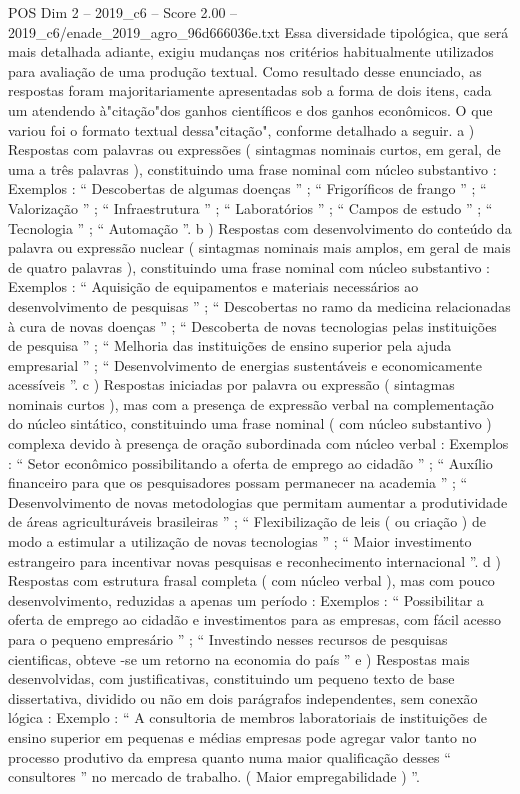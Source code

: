 \begin{textsample}{POS Dim 2 – 2019\_c6 – Score 2.00 – 2019\_c6/enade\_2019\_agro\_96d666036e.txt}
Essa diversidade tipológica, que será mais detalhada adiante, exigiu mudanças nos critérios habitualmente utilizados para avaliação de uma produção textual.
Como resultado desse enunciado, as respostas foram majoritariamente apresentadas sob a forma de dois itens, cada um atendendo à"citação"dos ganhos científicos e dos ganhos econômicos.
O que variou foi o formato textual dessa"citação", conforme detalhado a seguir. a ) Respostas com palavras ou expressões ( sintagmas nominais curtos, em geral, de uma a três palavras ), constituindo uma frase nominal com núcleo substantivo : Exemplos : “ Descobertas de algumas doenças ” ; “ Frigoríficos de frango ” ; “ Valorização ” ; “ Infraestrutura ” ; “ Laboratórios ” ; “ Campos de estudo ” ; “ Tecnologia ” ; “ Automação ”. b ) Respostas com desenvolvimento do conteúdo da palavra ou expressão nuclear ( sintagmas nominais mais amplos, em geral de mais de quatro palavras ), constituindo uma frase nominal com núcleo substantivo : Exemplos : “ Aquisição de equipamentos e materiais necessários ao desenvolvimento de pesquisas ” ; “ Descobertas no ramo da medicina relacionadas à cura de novas doenças ” ; “ Descoberta de novas tecnologias pelas instituições de pesquisa ” ; “ Melhoria das instituições de ensino superior pela ajuda empresarial ” ; “ Desenvolvimento de energias sustentáveis e economicamente acessíveis ”. c ) Respostas iniciadas por palavra ou expressão ( sintagmas nominais curtos ), mas com a presença de expressão verbal na complementação do núcleo sintático, constituindo uma frase nominal ( com núcleo substantivo ) complexa devido à presença de oração subordinada com núcleo verbal : Exemplos : “ Setor econômico possibilitando a oferta de emprego ao cidadão ” ; “ Auxílio financeiro para que os pesquisadores possam permanecer na academia ” ; “ Desenvolvimento de novas metodologias que permitam aumentar a produtividade de áreas agriculturáveis brasileiras ” ; “ Flexibilização de leis ( ou criação ) de modo a estimular a utilização de novas tecnologias ” ; “ Maior investimento estrangeiro para incentivar novas pesquisas e reconhecimento internacional ”. d ) Respostas com estrutura frasal completa ( com núcleo verbal ), mas com pouco desenvolvimento, reduzidas a apenas um período : Exemplos : “ Possibilitar a oferta de emprego ao cidadão e investimentos para as empresas, com fácil acesso para o pequeno empresário ” ; “ Investindo nesses recursos de pesquisas cientificas, obteve -se um retorno na economia do país ” e ) Respostas mais desenvolvidas, com justificativas, constituindo um pequeno texto de base dissertativa, dividido ou não em dois parágrafos independentes, sem conexão lógica : Exemplo : “ A consultoria de membros laboratoriais de instituições de ensino superior em pequenas e médias empresas pode agregar valor tanto no processo produtivo da empresa quanto numa maior qualificação desses “ consultores ” no mercado de trabalho. ( Maior empregabilidade ) ”.

\end{textsample}
